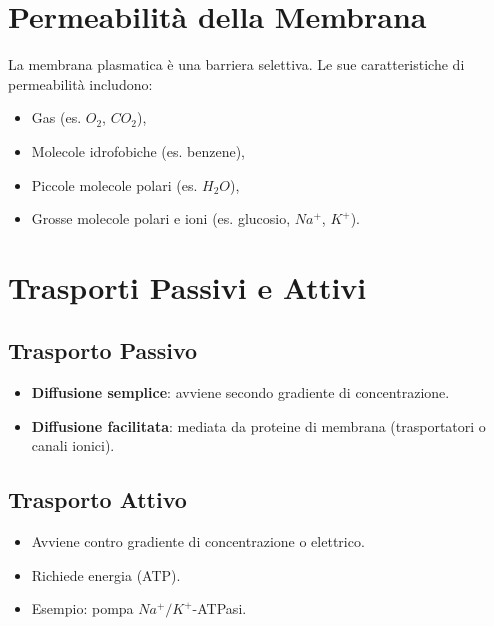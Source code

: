 \documentclass{article}
\begin{document}
\section{Permeabilità della Membrana}
La membrana plasmatica è una barriera selettiva. Le sue caratteristiche di permeabilità includono:
\begin{itemize}
    \item Gas (es. \(O_2\), \(CO_2\)),
    \item Molecole idrofobiche (es. benzene),
    \item Piccole molecole polari (es. \(H_2O\)),
    \item Grosse molecole polari e ioni (es. glucosio, \(Na^+\), \(K^+\)).
\end{itemize}

\section{Trasporti Passivi e Attivi}
\subsection{Trasporto Passivo}
\begin{itemize}
    \item \textbf{Diffusione semplice}: avviene secondo gradiente di concentrazione.
    \item \textbf{Diffusione facilitata}: mediata da proteine di membrana (trasportatori o canali ionici).
\end{itemize}

\subsection{Trasporto Attivo}
\begin{itemize}
    \item Avviene contro gradiente di concentrazione o elettrico.
    \item Richiede energia (ATP).
    \item Esempio: pompa \(Na^+/K^+\)-ATPasi.
\end{itemize}
\end{document}
